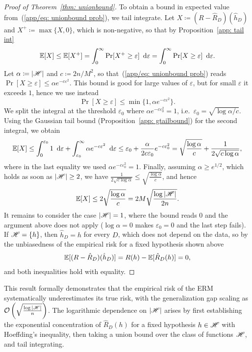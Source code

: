 \documentclass[reqno]{amsart}
\begin{document}
\begin{theorem}
\begin{proof}[Proof of Theorem~\ref{thm: unionbound}]
To obtain a bound in expected value from~(\ref{app/eq: unionbound prob}), we tail integrate. Let $X\coloneq(R-\hat R_D)(\hat h_D)$ and $X^+\coloneq\max\{X,0\}$, which is non-negative, so that by Proposition~\ref{app: tail int}
\[
\mathbb{E}[X] \le \mathbb{E}[X^+] = \int_0^\infty \Pr[X^+\ge\varepsilon]\mathop{}\!\,\,\mathrm{d}\varepsilon = \int_0^\infty \Pr[X\ge\varepsilon]\mathop{}\!\,\,\mathrm{d}\varepsilon.
\]
Let $\alpha\coloneq\vert\mathscr{H}\vert$ and $c\coloneq 2n/M^2$, so that~(\ref{app/eq: unionbound prob}) reads $\Pr[X\ge\varepsilon]\le\alpha e^{-c\varepsilon^2}$. This bound is good for large values of $\varepsilon$, but for small $\varepsilon$ it exceeds $1$, hence we use instead
\[
\Pr[X\ge\varepsilon] \le \min\{1,\alpha e^{-c\varepsilon^2}\}.
\]
We split the integral at the threshold $\varepsilon_0$ where $\alpha e^{-c\varepsilon_0^2} = 1$, i.e.\ $\varepsilon_0 = \sqrt{\log\alpha/c}$. Using the Gaussian tail bound (Proposition~\ref{app: gtailbound}) for the second integral, we obtain
\[
\mathbb{E}[X] \le \int_0^{\varepsilon_0} 1\mathop{}\!\,\,\mathrm{d}\varepsilon + \int_{\varepsilon_0}^\infty \alpha e^{-c\varepsilon^2}\mathop{}\!\,\,\mathrm{d}\varepsilon
\le \varepsilon_0 + \frac{\alpha}{2c\varepsilon_0}e^{-c\varepsilon_0^2}
= \sqrt{\frac{\log\alpha}{c}} + \frac{1}{2\sqrt{c\log\alpha}},
\]
where in the last equality we used $\alpha e^{-c\varepsilon_0^2}=1$. Finally, assuming $\alpha\ge e^{1/2}$, which holds as soon as $\vert\mathscr{H}\vert\ge 2$, we have $\frac{1}{2\sqrt{c\log\alpha}}\le\sqrt{\frac{\log\alpha}{c}}$, and hence
\[
\mathbb{E}[X] \le 2\sqrt{\frac{\log\alpha}{c}} = 2M\sqrt{\frac{\log\vert\mathscr{H}\vert}{2n}}.
\]
It remains to consider the case $\vert\mathscr{H}\vert=1$, where the bound reads $0$ and the argument above does not apply ($\log\alpha=0$ makes $\varepsilon_0=0$ and the last step fails). If $\mathscr{H}=\{h\}$, then $\hat h_D=h$ for every $D$, which does not depend on the data, so by the unbiasedness of the empirical risk for a fixed hypothesis shown above
\[
\mathbb{E}[(R-\hat R_D)(\hat h_D)] = R(h) - \mathbb{E}[\hat R_D(h)] = 0,
\]
and both inequalities hold with equality.
\end{proof}
\end{theorem}

This result formally demonstrates that the empirical risk of the ERM systematically underestimates its true risk, with the generalization gap scaling as $\mathcal{O}\left(\sqrt{\frac{\log \vert\mathscr{H}\vert}{n}}\right)$.
The logarithmic dependence on $\vert\mathscr{H}\vert$ arises by first establishing the exponential concentration of $\hat{R}_D(h)$ for a fixed hypothesis $h \in \mathscr{H}$ with Hoeffding's inequality, then taking a union bound over the class of functions $\mathscr{H}$, and tail integrating. 
\end{document}
